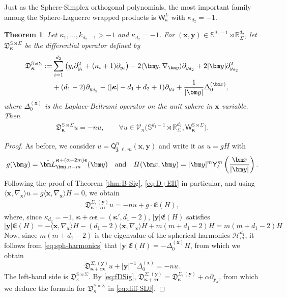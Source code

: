 \documentclass{amsart}
\newtheorem{thm}{Theorem}[section]
\theoremstyle{remark}
\def\la{{\langle}}
\def\ra{{\rangle}}
\def\sQ{{\mathsf Q}}
\def\sW{{\mathsf W}}
\def\sY{{\mathsf Y}}
\def\fD{{\mathfrak D}}
\def\fE{{\mathfrak E}}
\def\a{{\alpha}}
\def\k{{\kappa}}
\def\la{{\langle}}
\def\ra{{\rangle}}
\def\xb{{\bm x}}
\def\yb{{\bm y}}
\def\Lb{{\bm L}}
\def\CH{{\mathcal H}}
\def\CV{{\mathcal V}}
\def\RR{{\mathbb R}}
\def\SS{{\mathbb S}}
\def\bep{{\boldsymbol{\epsilon}}}
\def\bk{{\boldsymbol{\kappa}}}
\begin{document}
Just as the Sphere-Simplex orthogonal polynomials, the most important family among the Sphere-Laguerre wrapped products
is $\sW_{\k}^L$ with $\k_{d_2} = -1$. 

\begin{thm}
Let  $\k_1,\ldots, k_{d_2-1} > -1$ and $\k_{d_2} = -1$. For $(\bm x,\bm y) \in \SS^{d_1-1} \!\rtimes \RR_\Sigma^{d_2}$, 
let $\fD_{\bk}^{\SS \rtimes \Sigma}$ be the differential operator defined by 
\begin{align}\label{eq:diff-SL0}
  \fD_{\bk}^{\SS \rtimes \Sigma}:= &  \sum_{i=1}^{d_2} \left( y_i \partial_{y_i}^2 + (\kappa_i +1) \partial_{y_i} \right) 
      - 2 \la \bm y, \nabla_{\bm y} \ra \partial_{y_{d_2}}  + 2 |\yb|  \partial_{y_{d_2}}^2   \\
       & +(d_1-2) \partial_{y_{d_2}} - (|\bk| - d_1+d_2+1) \partial_{y_d} + \frac{1}{|\bm y|} \Delta_0^{(\bm x)}, \notag
\end{align}
where $\Delta_0^{(\bm x)}$ is the Laplace-Beltrami operator on the unit sphere in $\bm x$ variable. 
Then %
\begin{align}\label{eq:eigenSL0}
  \fD_{\bk}^{\SS \rtimes \Sigma} u = - n u, \qquad
       \forall u \in \CV_n\big(\SS^{d_1-1} \!\rtimes \RR_\Sigma^{d_2}, \sW_{\bk}^{\SS \rtimes \Sigma} \big).
\end{align}
\end{thm}

\begin{proof} 
As before, we consider $u = \sQ_{\bm j, \ell, m}^n(\bm x,\bm y)$ and write it as $u = g H$ with
$$
  g(\yb) = \hat \Lb_{\bm j, n-m}^{\bk+ (\a+2m)\bep}(\bm y) \quad \hbox{and}\quad H(\xb,\yb) = |\bm y|^m 
      \sY_{\ell}^m \left(\frac{\bm x}{|\bm y|}\right). 
$$
Following the proof of Theorem \ref{thm:B-Sig}, \eqref{eq:D+EH} in particular, and using 
$\la \xb,\nabla_\xb\ra u =  g \la \xb,\nabla_\xb\ra H = 0$, we obtain
\begin{align} \label{eq:D+EH-SSL}
  \fD_{\bk+ \alpha \bep}^{\Sigma, (\yb)} u  =  -n u  + g \cdot \fE(H), 
\end{align}
where, since $\k_{d_2} = -1$, $\bk + \alpha \bep = (\bk', d_1 -2)$, $|\yb| \fE(H)$ satisfies 
$$
    |\yb| \fE(H) = - \la \xb,\nabla_\xb\ra H - (d_1-2) \la \xb,\nabla_\xb\ra H + m (m+d_1-2)H = m (m+d_1-2)H
$$
 Now, since $m(m+d_1-2)$ is the eigenvalue of the spherical harmonics
$\CH_m^{d_1}$, it follows from \eqref{eq:sph-harmonics} that $|\yb| \fE(H) = - \Delta_0^{(\xb)} H$, from which 
we obtain 
\begin{equation}\label{eq:diff-SL02}
  \fD_{\bk+ \alpha \bep}^{\Sigma, (\yb)} u  + |\yb|^{-1} \Delta_0^{(\xb)} = -n u.
\end{equation}
The left-hand side is $\fD_\k^{\SS \rtimes \Sigma}$. By \eqref{eq:fDSig}, $\fD_{\bk+ \alpha \bep}^{\Sigma, (\yb)} =  \fD_{\bk}^{\Sigma, (\yb)} + \a \partial_{\yb_d}$, from which we deduce the formula for $\fD_\k^{\SS \rtimes \Sigma}$ 
in \eqref{eq:diff-SL0}. 
\end{proof}
\end{document}
